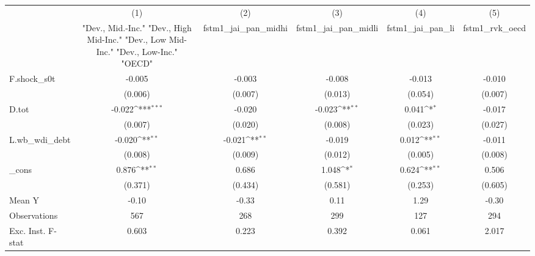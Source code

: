 {
\def\sym#1{\ifmmode^{#1}\else\(^{#1}\)\fi}
\begin{tabular}{l*{5}{c}}
\toprule
            &\multicolumn{1}{c}{(1)}&\multicolumn{1}{c}{(2)}&\multicolumn{1}{c}{(3)}&\multicolumn{1}{c}{(4)}&\multicolumn{1}{c}{(5)}\\
            &\multicolumn{1}{c}{ "Dev., Mid.-Inc." "Dev., High Mid-Inc." "Dev., Low Mid-Inc." "Dev., Low-Inc." "OECD" }&\multicolumn{1}{c}{fstm1\_jai\_pan\_midhi}&\multicolumn{1}{c}{fstm1\_jai\_pan\_midli}&\multicolumn{1}{c}{fstm1\_jai\_pan\_li}&\multicolumn{1}{c}{fstm1\_rvk\_oecd}\\
\midrule
F.shock\_s0t &      -0.005         &      -0.003         &      -0.008         &      -0.013         &      -0.010         \\
            &     (0.006)         &     (0.007)         &     (0.013)         &     (0.054)         &     (0.007)         \\
\addlinespace
D.tot       &      -0.022\sym{***}&      -0.020         &      -0.023\sym{**} &       0.041\sym{*}  &      -0.017         \\
            &     (0.007)         &     (0.020)         &     (0.008)         &     (0.023)         &     (0.027)         \\
\addlinespace
L.wb\_wdi\_debt&      -0.020\sym{**} &      -0.021\sym{**} &      -0.019         &       0.012\sym{**} &      -0.011         \\
            &     (0.008)         &     (0.009)         &     (0.012)         &     (0.005)         &     (0.008)         \\
\addlinespace
\_cons      &       0.876\sym{**} &       0.686         &       1.048\sym{*}  &       0.624\sym{**} &       0.506         \\
            &     (0.371)         &     (0.434)         &     (0.581)         &     (0.253)         &     (0.605)         \\
\midrule
Mean Y      &       -0.10         &       -0.33         &        0.11         &        1.29         &       -0.30         \\
Observations&         567         &         268         &         299         &         127         &         294         \\
Exc. Inst. F-stat&       0.603         &       0.223         &       0.392         &       0.061         &       2.017         \\
\bottomrule
\end{tabular}
}

